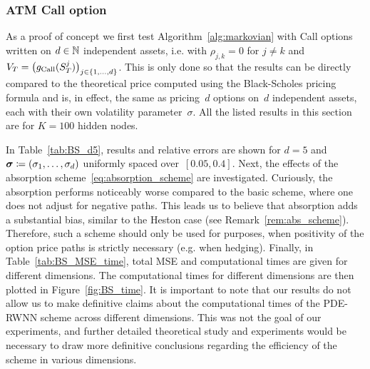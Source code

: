 \subsubsection{ATM Call option}\label{sec:resutls_call_BS}
As a proof of concept we first test Algorithm~\ref{alg:markovian} with Call options written on $d\in\mathbb{N}$ independent assets, i.e. with $\rho_{j,k}=0$ for $j\neq k$ and $V_T = \big(g_{\textup{Call}}(S^j_T)\big)_{j\in\{1,\dots,d\}}$. This is only done so that the results can be directly compared to the theoretical price computed using the Black-Scholes pricing formula and is, in effect, the same as pricing~$d$ options on~$d$  independent assets, each with their own volatility parameter~$\sigma$. All the listed results in this section are for $K=100$ hidden nodes.

In Table~\ref{tab:BS_d5}, results and relative errors are shown for $d=5$ and $\boldsymbol\sigma\coloneqq(\sigma_1,\dots,\sigma_d)$ uniformly spaced over~$[0.05, 0.4]$. Next, the effects of the absorption scheme~\eqref{eq:absorption_scheme} are investigated. Curiously, the absorption performs noticeably worse compared to the basic scheme, where one does not adjust for negative paths. This leads us to believe that absorption adds a substantial bias, similar to the Heston case (see Remark~\ref{rem:abs_scheme}). Therefore, such a scheme should only be used for purposes, when positivity of the option price paths is strictly necessary (e.g. when hedging). Finally, in Table~\ref{tab:BS_MSE_time}, total MSE and computational times are given for different dimensions. The computational times for different dimensions are then plotted in Figure~\ref{fig:BS_time}. It is important to note that our results do not allow us to make definitive claims about the computational times of the PDE-RWNN scheme across different dimensions. This was not the goal of our experiments, and further detailed theoretical study and experiments would be necessary to draw more definitive conclusions regarding the efficiency of the scheme in various dimensions.

